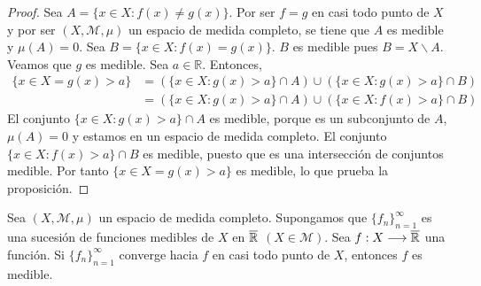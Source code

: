 \begin{proof}
    Sea $A = \{ x \in X : f(x) \not = g(x)\}$. Por ser $f = g$ en casi todo punto de $X$ y por ser $(X, \mathcal{M}, \mu)$ un espacio de medida completo, se tiene que $A$ es medible y $\mu(A) = 0$. Sea $B = \{ x \in X : f(x) = g(x)\}$. $B$ es medible pues $B = X \backslash A$. Veamos que $g$ es medible. Sea $a \in \mathbb{R}$. Entonces,
    \begin{align*}
        \{ x \in X = g(x) > a \} & = (\{ x \in X : g(x) > a\} \cap A) \cup (\{ x \in X : g(x) > a\} \cap B) \\
                                 & = (\{ x \in X : g(x) > a\} \cap A) \cup (\{ x \in X : f(x) > a\} \cap B)
    \end{align*}
    El conjunto $\{ x \in X : g(x) > a\} \cap A$ es medible, porque es un subconjunto de $A$, $\mu(A) = 0$ y estamos en un espacio de medida completo. El conjunto $\{ x \in X : f(x) > a\} \cap B$ es medible, puesto que es una intersección de conjuntos medible. Por tanto $\{ x \in X = g(x) > a \}$ es medible, lo que prueba la proposición.
\end{proof}

\begin{prop}
    Sea $(X, \mathcal{M}, \mu)$ un espacio de medida completo. Supongamos que $\{ f_n\}_{n=1}^{\infty}$ es una sucesión de funciones medibles de $X$ en $\overline{\mathbb{R}}$ $(X \in \mathcal{M})$. Sea $f: X \longrightarrow \overline{\mathbb{R}}$ una función. Si $\{ f_n\}_{n=1}^{\infty}$ converge hacia $f$ en casi todo punto de $X$, entonces $f$ es medible.
\end{prop}

